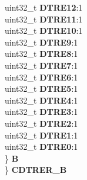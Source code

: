 \begin{DoxyCompactItemize}
\begin{tabbing}
\>\>uint32\_t {\bfseries DTRE12}:1\\
\>\>uint32\_t {\bfseries DTRE11}:1\\
\>\>uint32\_t {\bfseries DTRE10}:1\\
\>\>uint32\_t {\bfseries DTRE9}:1\\
\>\>uint32\_t {\bfseries DTRE8}:1\\
\>\>uint32\_t {\bfseries DTRE7}:1\\
\>\>uint32\_t {\bfseries DTRE6}:1\\
\>\>uint32\_t {\bfseries DTRE5}:1\\
\>\>uint32\_t {\bfseries DTRE4}:1\\
\>\>uint32\_t {\bfseries DTRE3}:1\\
\>\>uint32\_t {\bfseries DTRE2}:1\\
\>\>uint32\_t {\bfseries DTRE1}:1\\
\>\>uint32\_t {\bfseries DTRE0}:1\\
\>\} {\bfseries B}\\
\} {\bfseries CDTRER\_B}\\


\end{tabbing}
\end{DoxyCompactItemize}
